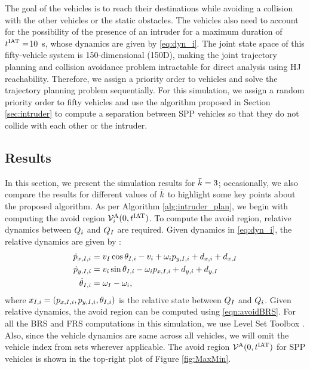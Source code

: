 The goal of the vehicles is to reach their destinations while avoiding a collision with the other vehicles or the static obstacles. The vehicles also need to account for the possibility of the presence of an intruder for a maximum duration of $t^\text{IAT} = $\SI{10}{\s}, whose dynamics are given by \eqref{eq:dyn_i}. The joint state space of this fifty-vehicle system is 150-dimensional (150D), making the joint trajectory planning and collision avoidance problem intractable for direct analysis using HJ reachability. Therefore, we assign a priority order to vehicles and solve the trajectory planning problem sequentially. For this simulation, we assign a random priority order to fifty vehicles and use the algorithm proposed in Section \ref{sec:intruder} to compute a separation between SPP vehicles so that they do not collide with each other or the intruder. 

\subsection{Results \label{sec:simResults}}
In this section, we present the simulation results for $\bar{k} = 3$; occasionally, we also compare the results for different values of $\bar{k}$ to highlight some key points about the proposed algorithm. As per Algorithm \ref{alg:intruder_plan}, we begin with computing the avoid region $\mathcal{V}^{\text{A}}_{i}(0, t^\text{IAT})$. To compute the avoid region, relative dynamics between $Q_i$ and $Q_{I}$ are required. Given dynamics in \eqref{eq:dyn_i}, the relative dynamics are given by \cite{Mitchell05}:
\begin{equation}
\label{eq:reldyn_i}
\begin{aligned}
\dot{\pos}_{x, \intr, i} &= v_{\intr} \cos \theta_{\intr, i} - v_i + \omega_i {\pos}_{y, \intr, i} + d_{x,i} + d_{x,\intr}\\
\dot{\pos}_{y, \intr, i} &= v_i \sin \theta_{\intr, i} - \omega_i {\pos}_{x, \intr, i} + d_{y,i} + d_{y,\intr}\\
\dot{\theta}_{\intr, i} &= \omega_{\intr} - \omega_i,
\end{aligned}
\end{equation}    
where $x_{I, i} = (p_{x, I, i}, p_{y, I, i}, \theta_{I, i})$ is the relative state between $Q_{I}$ and $Q_i$. Given relative dynamics, the avoid region can be computed using \eqref{eqn:avoidBRS}. For all the BRS and FRS computations in this simulation, we use Level Set Toolbox \cite{Mitchell07b}. Also, since the vehicle dynamics are same across all vehicles, we will omit the vehicle index from sets wherever applicable. The avoid region $\mathcal{V}^{\text{A}}(0, t^\text{IAT})$ for SPP vehicles is shown in the top-right plot of Figure \ref{fig:MaxMin}.

